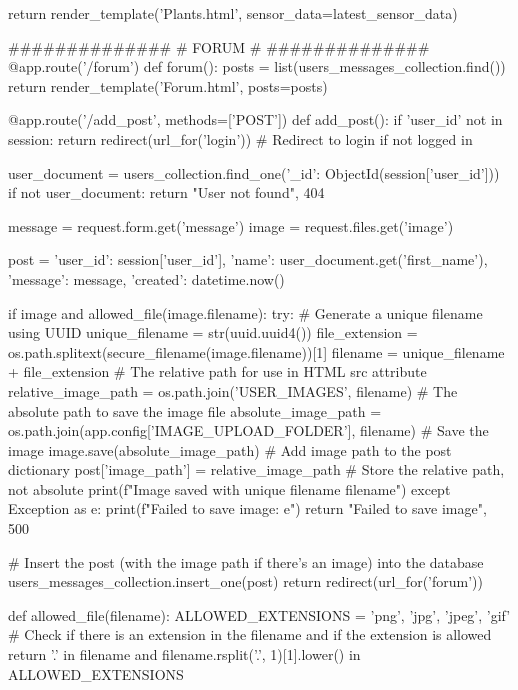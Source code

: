 \documentclass[12pt]{article} %
\begin{document}
\begin{pythoncode}[caption={Main Flask Backend Code}]
        return render_template('Plants.html', sensor_data=latest_sensor_data)
       
    ##############
    #   FORUM    #
    ##############
    @app.route('/forum')
    def forum():
        posts = list(users_messages_collection.find())
        return render_template('Forum.html', posts=posts)
    
    
    @app.route('/add_post', methods=['POST'])
    def add_post():
        if 'user_id' not in session:
            return redirect(url_for('login'))  # Redirect to login if not logged in
    
        user_document = users_collection.find_one({'_id': ObjectId(session['user_id'])})
        if not user_document:
            return "User not found", 404
    
        message = request.form.get('message')
        image = request.files.get('image')
        
        post = {'user_id': session['user_id'], 
                'name': user_document.get('first_name'), 
                'message': message, 
                'created': datetime.now()}
    
        if image and allowed_file(image.filename):
            try:
                # Generate a unique filename using UUID
                unique_filename = str(uuid.uuid4())
                file_extension = os.path.splitext(secure_filename(image.filename))[1]
                filename = unique_filename + file_extension
                # The relative path for use in HTML src attribute
                relative_image_path = os.path.join('USER_IMAGES', filename)
                # The absolute path to save the image file
                absolute_image_path = os.path.join(app.config['IMAGE_UPLOAD_FOLDER'], filename)
                # Save the image
                image.save(absolute_image_path)
                # Add image path to the post dictionary
                post['image_path'] = relative_image_path  # Store the relative path, not absolute
                print(f"Image saved with unique filename {filename}")
            except Exception as e:
                print(f"Failed to save image: {e}")
                return "Failed to save image", 500
    
        # Insert the post (with the image path if there's an image) into the database
        users_messages_collection.insert_one(post)
        return redirect(url_for('forum')) 
    
    
    def allowed_file(filename):
        ALLOWED_EXTENSIONS = {'png', 'jpg', 'jpeg', 'gif'}
        # Check if there is an extension in the filename and if the extension is allowed
        return '.' in filename and filename.rsplit('.', 1)[1].lower() in ALLOWED_EXTENSIONS
    

\end{pythoncode}
\end{document}
